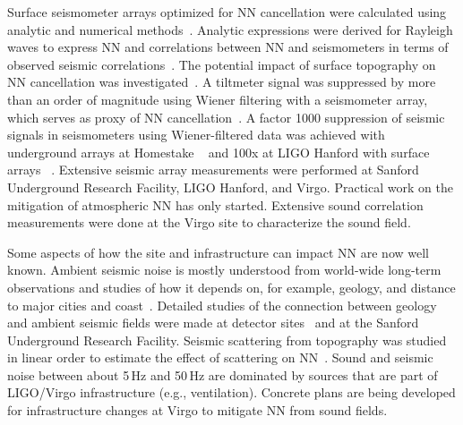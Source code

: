 Surface seismometer arrays optimized for NN cancellation were calculated using analytic and numerical methods~\cite{Har2015,CoEA2016a}. Analytic expressions were derived for Rayleigh waves to express NN and correlations between NN and seismometers in terms of observed seismic correlations~\cite{Har2015,CoEA2016a}. The potential impact of surface topography on NN cancellation was investigated~\cite{CoHa2012}. A tiltmeter signal was suppressed by more than an order of magnitude using Wiener filtering with a seismometer array, which serves as proxy of NN cancellation~\cite{HaVe2016,CoEA2018}. A factor 1000 suppression of seismic signals in seismometers using Wiener-filtered data was achieved with underground arrays at Homestake ~\cite{CoEA2014} and 100x at LIGO Hanford with surface arrays ~\cite{CoEA2018}. Extensive seismic array measurements were performed at Sanford Underground Research Facility, LIGO Hanford, and Virgo. Practical work on the mitigation of atmospheric NN has only started. Extensive sound correlation measurements were done at the Virgo site to characterize the sound field.

Some aspects of how the site and infrastructure can impact NN are now well known. 
Ambient seismic noise is mostly understood from world-wide long-term observations and studies of how it depends on, for example, geology, and distance to major cities and coast~\cite{CoHa2012b}. Detailed studies of the connection between geology and ambient seismic fields were made at detector sites~\cite{HaOR2011} and at the Sanford Underground Research Facility. Seismic scattering from topography was studied in linear order to estimate the effect of scattering on NN~\cite{CoHa2012}. Sound and seismic noise between about 5\,Hz and 50\,Hz are dominated by sources that are part of LIGO/Virgo infrastructure (e.g., ventilation). Concrete plans are being developed for infrastructure changes at Virgo to mitigate NN from sound fields.

